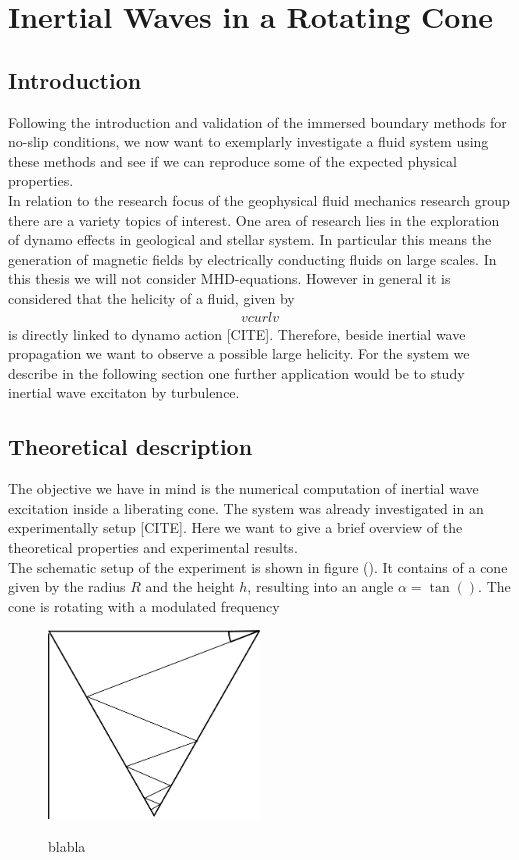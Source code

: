 \chapter{Inertial Waves in a Rotating Cone}

\section{Introduction}

Following the introduction and validation of the immersed boundary methods for no-slip conditions,
we now want to exemplarly investigate a fluid system using these methods
and see if we can reproduce some of the expected physical properties.\\
In relation to the research focus of the geophysical fluid mechanics research group there are a variety
topics of interest.
One area of research lies in the exploration of dynamo effects in geological and stellar system.
In particular this means the generation of magnetic fields by electrically conducting fluids on large scales.
In this thesis we will not consider MHD-equations.
However in general it is considered that the helicity of a fluid, given by
\begin{align}
    v curl v
\end{align}
is directly linked to dynamo action [CITE].
Therefore, beside inertial wave propagation we want to observe a possible large helicity.
For the system we describe in the following section one further application
would be to study inertial wave excitaton by turbulence.

\section{Theoretical description}

The objective we have in mind is the numerical computation of inertial wave excitation inside a liberating cone.
The system was already investigated in an experimentally setup [CITE].
Here we want to give a brief overview of the theoretical properties and experimental results.\\
The schematic setup of the experiment is shown in figure ().
It contains of a cone given by the radius $R$ and the height $h$, resulting into an angle $\alpha = \tan()$.
The cone is rotating with a modulated frequency

\begin{figure}[!tbp]
  \centering
  \includegraphics[width=0.5\textwidth]{gfx/cone/cone.pdf}\label{fig:cone_cone}
  \caption{blabla}
\end{figure}


